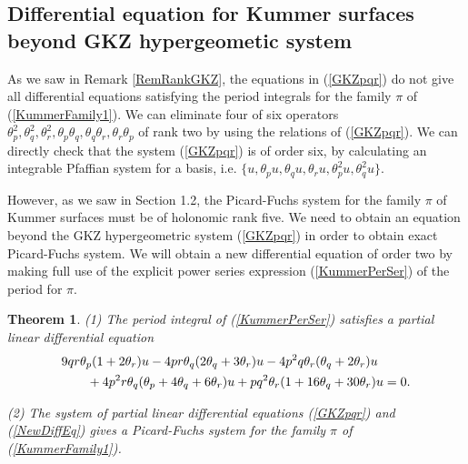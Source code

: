 \documentclass[10pt]{article}
\newtheorem{thm}{Theorem}[section]
\begin{document}
\subsection{Differential equation for Kummer surfaces beyond GKZ hypergeometic system}

As we saw in Remark \ref{RemRankGKZ}, 
the equations in (\ref{GKZpqr}) do not give all differential equations satisfying the period integrals for the family $\pi$ of (\ref{KummerFamily1}).
We can eliminate four of six operators $\theta_p^2 , \theta_q^2 , \theta_r^2 , \theta_p \theta_q  , \theta_q \theta_r  ,  \theta_r \theta_p  $
of rank two
by using the relations of (\ref{GKZpqr}).
We can directly check that 
the  system (\ref{GKZpqr}) is of order six, by calculating an integrable Pfaffian system for a basis, i.e. 
$\{u,\theta_p u, \theta_q u, \theta_r u, \theta_{p}^2 u, \theta_{q}^2 u\}$.

However, 
as we saw in Section 1.2,
the Picard-Fuchs system for the family $\pi$ of Kummer surfaces must be of holonomic rank five.
We need to obtain an equation beyond the GKZ hypergeometric system (\ref{GKZpqr})
in order to obtain exact Picard-Fuchs system.
We will obtain a new differential equation of order two
by making full use of the explicit power series expression (\ref{KummerPerSer}) of the period for $\pi$.


\begin{thm}\label{ThmPFS}
(1) The period integral of (\ref{KummerPerSer}) satisfies a partial linear differential equation
\begin{align}\label{NewDiffEq}
&9 q r \theta_p( 1+ 2 \theta_r) u 
-  4 p r \theta_q (2 \theta_q + 3 \theta_r)u 
-  4 p^2 q \theta_r (\theta_q + 2 \theta_r) u \notag \\
&\quad\quad +  4 p^2 r \theta_q (\theta_p + 4 \theta_q + 6 \theta_r) u 
+  p q^2 \theta_r (1+ 16 \theta_q  + 30 \theta_r)u =0.
\end{align}

(2) The system of partial linear differential equations (\ref{GKZpqr}) and (\ref{NewDiffEq}) gives a Picard-Fuchs system for the family $\pi$  of  (\ref{KummerFamily1}).
\end{thm}
\end{document}

